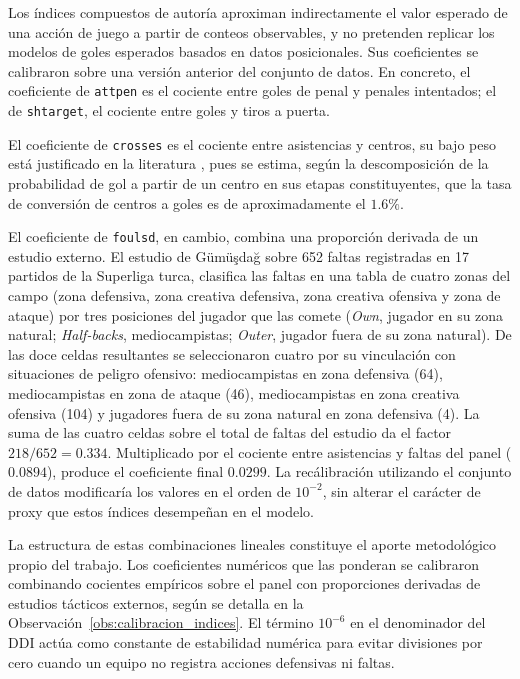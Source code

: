 \begin{obs}
	\label{obs:calibracion_indices}
	Los \'indices compuestos de autor\'ia aproximan indirectamente el valor esperado de una acci\'on de juego a partir de conteos observables, y no pretenden replicar los modelos de goles esperados basados en datos posicionales. Sus coeficientes se calibraron sobre una versi\'on anterior del conjunto de datos. En concreto, el coeficiente de \texttt{attpen} es el cociente entre goles de penal y penales intentados; el de \texttt{shtarget}, el cociente entre goles y tiros a puerta. 
	
	El coeficiente de \texttt{crosses} es el cociente entre asistencias y centros, su bajo peso est\'a justificado en la literatura \cite{soccerment2017crossing}, pues se estima, seg\'un la descomposici\'on de la probabilidad de gol a partir de un centro en sus etapas constituyentes, que la tasa de conversi\'on de centros a goles es de aproximadamente el $1.6\%$.
	
	El coeficiente de \texttt{foulsd}, en cambio, combina una proporci\'on derivada de un estudio externo. El estudio de  G\"um\"u\c{s}da\u{g} \cite{gumusdag2011aggression} sobre 652 faltas registradas en 17 partidos de la Superliga turca, clasifica las faltas en una tabla de cuatro zonas del campo (zona defensiva, zona creativa defensiva, zona creativa ofensiva y zona de ataque) por tres posiciones del jugador que las comete (\textit{Own}, jugador en su zona natural; \textit{Half-backs}, mediocampistas; \textit{Outer}, jugador fuera de su zona natural). De las doce celdas resultantes se seleccionaron cuatro por su vinculaci\'on con situaciones de peligro ofensivo: mediocampistas en zona defensiva (64), mediocampistas en zona de ataque (46), mediocampistas en zona creativa ofensiva (104) y jugadores fuera de su zona natural en zona defensiva (4). La suma de las cuatro celdas sobre el total de faltas del estudio da el factor $218/652 = 0{.}334$. Multiplicado por el cociente entre asistencias y faltas del panel ($0{.}0894$), produce el coeficiente final $0{.}0299$. La rec\'alibraci\'on utilizando el conjunto de datos modificar\'ia los valores en el orden de $10^{-2}$, sin alterar el car\'acter de proxy que estos \'indices desempe\~nan en el modelo.
\end{obs}

La estructura de estas combinaciones lineales constituye el aporte metodol\'ogico propio del trabajo. Los coeficientes num\'ericos que las ponderan se calibraron combinando cocientes emp\'iricos sobre el panel con proporciones derivadas de estudios t\'acticos externos, seg\'un se detalla en la Observaci\'on~\ref{obs:calibracion_indices}. El t\'ermino $10^{-6}$ en el denominador del DDI act\'ua como constante de estabilidad num\'erica para evitar divisiones por cero cuando un equipo no registra acciones defensivas ni faltas.

